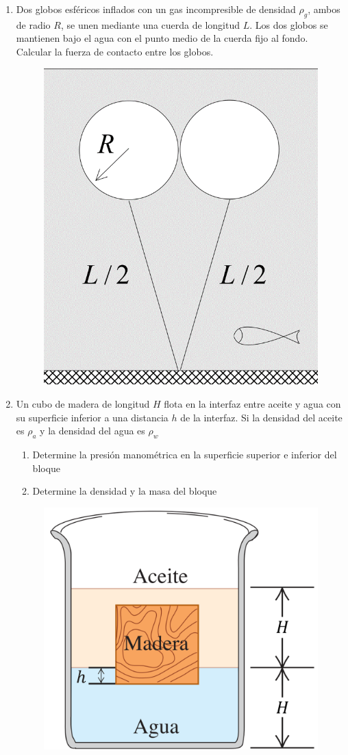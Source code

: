 \documentclass[letterpaper,11pt]{article}
\begin{document}
\begin{enumerate}
\item
\begin{multicols}{2}
    Dos globos esféricos inflados con un gas incompresible de densidad $\rho_g$, ambos de radio $R$, se unen mediante una cuerda de longitud $L$. Los dos globos se mantienen bajo el agua con el punto medio de la cuerda fijo al fondo. Calcular la fuerza de contacto entre los globos.
    
    \columnbreak
    
    \begin{figure}[H]
        \centering
        \includegraphics[height=0.4\linewidth]{2021-2/img/aux14/globos.png}
    \end{figure}
\end{multicols}


\item
\begin{multicols}{2}
    Un cubo de madera de longitud $H$ flota en la interfaz entre aceite y agua con su superficie inferior a una distancia $h$ de la interfaz. Si la densidad del aceite es $\rho_{a}$ y la densidad del agua es $\rho_{w}$
    
        \begin{enumerate}
            \item Determine la presión manométrica en la superficie superior e inferior del bloque
            \item Determine la densidad y la masa del bloque 
        \end{enumerate}
    
    \columnbreak
    
    \begin{figure}[H]
        \centering
        \includegraphics[width=0.45\linewidth]{2021-2/img/aux14/cubo-madera.png}
    \end{figure}
\end{multicols}

%   

\end{enumerate}
\end{document}
